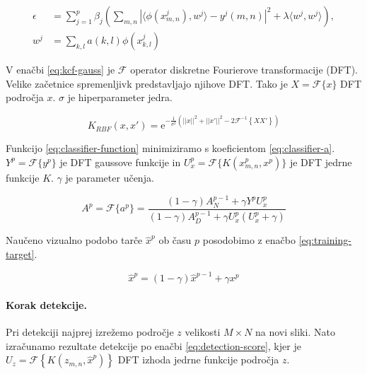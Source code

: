 \begin{equation}
\begin{aligned}
\epsilon &= \sum_{j=1}^p \beta_j \left( 
	\sum_{m,n} \left| \langle \phi\left(x_{m,n}^j \right), w^j \rangle - y^j(m,n) \right|^2
    + \lambda \langle w^j, w^j \rangle
\right), \\
w^j &= \sum_{k,l} a(k,l) \phi\left(x_{k,l}^j  \right)
\end{aligned}
\label{eq:classifier-function}
\end{equation}

V enačbi \eqref{eq:kcf-gauss} je $\mathcal{F}$ operator diskretne Fourierove transformacije (DFT). Velike začetnice spremenljivk predstavljajo njihove DFT. Tako je $X = \mathcal{F}\{ {x} \}$ DFT področja $x$. $\sigma$ je hiperparameter jedra.

\begin{equation}
K_{RBF}({x}, {x}') = \mathrm{e}^{-\frac{1}{\sigma^2}\left(
	||{x}||^2 + ||{x}'||^2 - 2 \mathcal{F}^{-1}\left\{ {X} {X}' \right\}
\right)}
\label{eq:kcf-gauss}
\end{equation}

Funkcijo \eqref{eq:classifier-function} minimiziramo s koeficientom \eqref{eq:classifier-a}.  $Y^p = \mathcal{F}\{y^p\}$ je DFT gaussove funkcije in $U_x^p = \mathcal{F}\{ K(x_{m,n}^p, x^p) \}$ je DFT jedrne funkcije $K$. $\gamma$ je parameter učenja.

\begin{equation}
A^p = \mathcal{F}\{a^p\} =  \frac{(1- \gamma) A_N^{p-1} + \gamma Y^p U_x^p}
{(1- \gamma)A_D^{p-1} + \gamma U_x^p\left( U_x^p + \gamma \right)}
\label{eq:classifier-a}
\end{equation}

Naučeno vizualno podobo tarče $\hat{x}^p$ ob času $p$ posodobimo z enačbo \eqref{eq:training-target}.

\begin{equation}
\hat{x}^p = (1 - \gamma) \hat{x}^{p-1} + \gamma x^p
\label{eq:training-target}
\end{equation}


\paragraph{Korak detekcije.}
Pri detekciji najprej izrežemo področje $z$ velikosti $M \times N$ na novi sliki. Nato izračunamo rezultate detekcije po enačbi \eqref{eq:detection-score}, kjer je $U_z = \mathcal{F}\left\{ K\left( z_{m,n}, \hat{x}^{p}  \right) \right\}$ DFT izhoda jedrne funkcije področja $z$.

